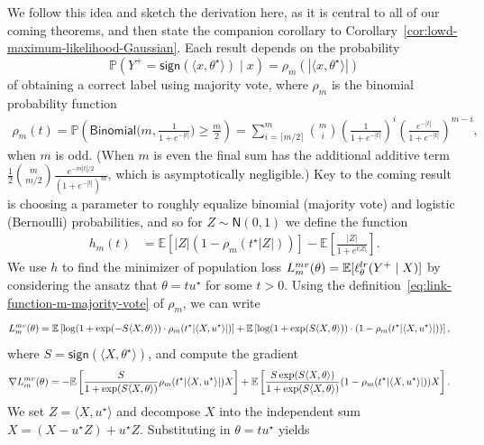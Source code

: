 \documentclass[11pt]{article}
\newcommand{\Ep}{\mathbb{E}}
\newcommand{\Prb}{\mathbb{P}}
\renewcommand{\P}{\mathbb{P}}
\newcommand{\brk}[1]{\left[{#1}\right]} %
\newcommand{\majY}{Y^+}
\newcommand{\sgn}{\mathsf{sign}}
\newcommand{\normal}{\mathsf{N}}
\newcommand{\bindist}{\mathsf{Binomial}}
\newcommand{\lr}{^{\textup{lr}}}
\newcommand{\mv}{^{\textup{mv}}}
\newcommand{\poploss}{L}
\newcommand{\<}{\langle} %
\renewcommand{\>}{\rangle}
\newcommand{\opt}{^\star}
\begin{document}
We follow this idea and sketch the derivation here, as it is central to all
of our coming theorems, and then state the companion corollary to
Corollary~\ref{cor:lowd-maximum-likelihood-Gaussian}.  Each result depends
on the probability
\begin{equation*}
  \Prb(\majY = \sgn(\<x, \theta^\star\>) \mid x)
  = \rho_m(|\<x, \theta^\star\>|)
\end{equation*}
of obtaining a correct label using majority vote,
where $\rho_m$ is the binomial probability function
\begin{align}
  \rho_m(t) =
  \P\left(\bindist\Big(m, \frac{1}{1 + e^{-|t|}}\Big)\ge \frac{m}{2}\right)
  = 
  \sum_{i=\lceil m/2 \rceil}^m \binom{m}{i} \left(\frac{1}{1 + e^{-|t|}} \right)^i \left(\frac{e^{-|t|}}{1 + e^{-|t|}} \right)^{m-i}, \label{eq:link-function-m-majority-vote}
\end{align}
when $m$ is odd. (When $m$ is even the final sum has the additional additive
term $\frac 1 2 \binom{m}{m/2} \frac{e^{-m|t|/2}}{(1 + e^{-|t|})^m}$, which
is asymptotically negligible.) Key to the coming result is choosing a
parameter to roughly equalize binomial (majority vote) and logistic
(Bernoulli) probabilities, and so for $Z \sim \normal(0, 1)$ we define the
function
\begin{align}
  h_m(t) &  = \Ep \brk{|Z|(1-\rho_m(t^\star |Z|))}-\Ep
  \brk{\frac{|Z|}{1 + e^{t|Z|}}}.
  \label{eqn:h-centering}
\end{align}
We use $h$ to find the minimizer of population loss $\poploss\mv_m(\theta) =
\Ep[ \ell_\theta\lr(\majY \mid X)]$ by considering the ansatz
that $\theta = t u^\star$ for
some $t > 0$. Using the definition~\eqref{eq:link-function-m-majority-vote}
of $\rho_m$, we can write
\begin{align*}
  \poploss\mv_m(\theta)  
  & = \Ep\left[\log(1 + \exp(-S \<X, \theta\>)) \cdot\rho_m(t^\star| \<X, u^\star\>|) \right]  + \Ep\left[\log(1 + \exp(S\<X, \theta\>)) \cdot (1-\rho_m(t^\star|\<X, u^\star\>|)) \right],
\end{align*}
where $S = \sgn(\<X, \theta^\star\>)$, and compute the gradient
\begin{align*}
  \nabla \poploss\mv_m(\theta) & = - \Ep \left[\frac{S}{1 + \exp(S \<X, \theta\>)} \rho_m(t^\star |\<X, u^\star\>|) X \right] + \Ep \left[\frac{S\exp(S \<X, \theta\>)}{1 + \exp(S \<X, \theta\>)} (1-\rho_m(t^\star|\<X, u^\star\>|)) X \right].
\end{align*}
We set $Z = \<X, u^\star\>$ and decompose $X$ into the independent sum $X =
(X - u^\star Z) + u^\star Z$. Substituting in $\theta = t u\opt$ yields
\end{document}
